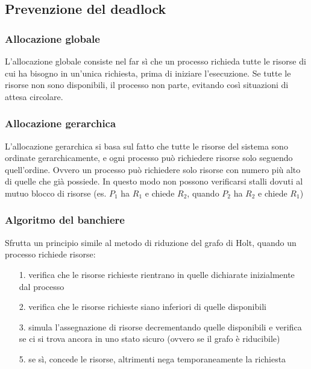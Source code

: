 \documentclass[a4paper]{article}
\begin{document}
\newpage


\subsection{Prevenzione del deadlock}
\subsubsection*{Allocazione globale}
L'allocazione globale consiste nel far sì che un processo richieda tutte le risorse di cui ha bisogno in un'unica richiesta,
prima di iniziare l'esecuzione. Se tutte le risorse non sono disponibili, il processo non parte, evitando così situazioni di
attesa circolare.

\subsubsection*{Allocazione gerarchica}
L'allocazione gerarchica si basa sul fatto che tutte le risorse del sistema sono ordinate gerarchicamente, e ogni processo può
richiedere risorse solo seguendo quell’ordine. Ovvero un processo può richiedere solo risorse con numero più alto di quelle che
già possiede. In questo modo non possono verificarsi stalli dovuti al mutuo blocco di risorse (es. \(P_1\) ha \(R_1\) e chiede
\(R_2\), quando \(P_2\) ha \(R_2\) e chiede \(R_1\))

\subsubsection*{Algoritmo del banchiere}
Sfrutta un principio simile al metodo di riduzione del grafo di Holt, quando un processo richiede risorse:
\begin{itemize}
	\item[1.] verifica che le risorse richieste rientrano in quelle dichiarate inizialmente dal processo
	\item[2.] verifica che le risorse richieste siano inferiori di quelle disponibili
	\item[3.] simula l'assegnazione di risorse decrementando quelle disponibili e verifica se ci si trova ancora in uno stato
	sicuro (ovvero se il grafo è riducibile)
	\item[5.] se sì, concede le risorse, altrimenti nega temporaneamente la richiesta
\end{itemize}
\end{document}
